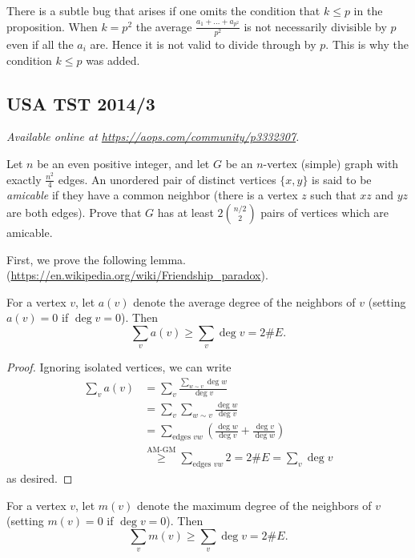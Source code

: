 \documentclass[11pt]{scrartcl}
\begin{document}
\begin{remark*}
  There is a subtle bug that arises
  if one omits the condition that $k \le p$ in the proposition.
  When $k = p^2$ the average $\frac{a_1 + \dots + a_{p^2}}{p^2}$
  is not necessarily divisible by $p$
  even if all the $a_i$ are.
  Hence it is not valid to divide through by $p$.
  This is why the condition $k \le p$ was added.
\end{remark*}
\pagebreak

\subsection{USA TST 2014/3}
\textsl{Available online at \url{https://aops.com/community/p3332307}.}
\begin{mdframed}[style=mdpurplebox,frametitle={Problem statement}]
Let $n$ be an even positive integer,
and let $G$ be an $n$-vertex (simple) graph
with exactly $\frac{n^2}{4}$ edges.
An unordered pair of distinct vertices $\{x,y\}$
is said to be \emph{amicable} if they have a common neighbor
(there is a vertex $z$ such that $xz$ and $yz$ are both edges).
Prove that $G$ has at least $2\binom{n/2}{2}$
pairs of vertices which are amicable.
\end{mdframed}
First, we prove the following lemma.
(\url{https://en.wikipedia.org/wiki/Friendship_paradox}).
\begin{lemma*}
  For a vertex $v$, let $a(v)$ denote
  the average degree of the neighbors of $v$
  (setting $a(v) = 0$ if $\deg v = 0$).
  Then
  \[ \sum_v a(v) \ge \sum_v \deg v = 2 \# E. \]
\end{lemma*}
\begin{proof}
  Ignoring isolated vertices, we can write
  \begin{align*}
    \sum_v a(v)
    &= \sum_v \frac{\sum_{w \sim v} \deg w}{\deg v} \\
    &= \sum_{v} \sum_{w \sim v} \frac{\deg w}{\deg v} \\
    &= \sum_{\text{edges } vw} \left(
      \frac{\deg w}{\deg v} + \frac{\deg v}{\deg w} \right) \\
    &\overset{\text{AM-GM}}{\ge} \sum_{\text{edges } vw} 2
      = 2\#E = \sum_{v} \deg v
  \end{align*}
  as desired.
\end{proof}
\begin{corollary*}
  For a vertex $v$, let $m(v)$ denote
  the maximum degree of the neighbors of $v$
  (setting $m(v) = 0$ if $\deg v = 0$).
  Then
  \[ \sum_v m(v) \ge \sum_v \deg v = 2 \# E. \]
\end{corollary*}
\end{document}
